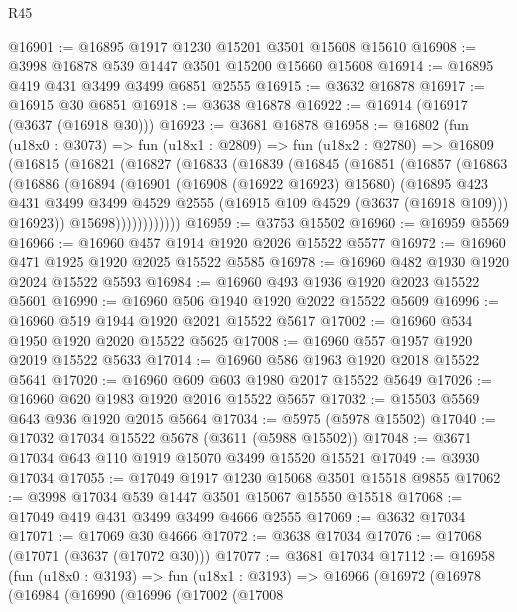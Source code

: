 \begin{lexlean}{R45}
\begin{coremodule}
@16901 := @16895 @1917 @1230 @15201 @3501 @15608 @15610
@16908 := @3998 @16878 @539 @1447 @3501 @15200 @15660 @15608
@16914 := @16895 @419 @431 @3499 @3499 @6851 @2555
@16915 := @3632 @16878
@16917 := @16915 @30 @6851
@16918 := @3638 @16878
@16922 := @16914 (@16917 (@3637 (@16918 @30)))
@16923 := @3681 @16878
@16958 := @16802
    (fun (u18x0 : @3073) =>
    fun (u18x1 : @2809) =>
    fun (u18x2 : @2780) =>
    @16809
      (@16815
        (@16821
          (@16827
            (@16833
              (@16839
                (@16845
                  (@16851
                    (@16857
                      (@16863
                        (@16886
                          (@16894
                            (@16901
                              (@16908 (@16922 @16923) @15680)
                              (@16895
                                @423
                                @431
                                @3499
                                @3499
                                @4529
                                @2555
                                (@16915 @109 @4529 (@3637 (@16918 @109)))
                                @16923))
                            @15698))))))))))))
@16959 := @3753 @15502
@16960 := @16959 @5569
@16966 := @16960 @457 @1914 @1920 @2026 @15522 @5577
@16972 := @16960 @471 @1925 @1920 @2025 @15522 @5585
@16978 := @16960 @482 @1930 @1920 @2024 @15522 @5593
@16984 := @16960 @493 @1936 @1920 @2023 @15522 @5601
@16990 := @16960 @506 @1940 @1920 @2022 @15522 @5609
@16996 := @16960 @519 @1944 @1920 @2021 @15522 @5617
@17002 := @16960 @534 @1950 @1920 @2020 @15522 @5625
@17008 := @16960 @557 @1957 @1920 @2019 @15522 @5633
@17014 := @16960 @586 @1963 @1920 @2018 @15522 @5641
@17020 := @16960 @609 @603 @1980 @2017 @15522 @5649
@17026 := @16960 @620 @1983 @1920 @2016 @15522 @5657
@17032 := @15503 @5569 @643 @936 @1920 @2015 @5664
@17034 := @5975 (@5978 @15502)
@17040 := @17032 @17034 @15522 @5678 (@3611 (@5988 @15502))
@17048 := @3671 @17034 @643 @110 @1919 @15070 @3499 @15520 @15521
@17049 := @3930 @17034
@17055 := @17049 @1917 @1230 @15068 @3501 @15518 @9855
@17062 := @3998 @17034 @539 @1447 @3501 @15067 @15550 @15518
@17068 := @17049 @419 @431 @3499 @3499 @4666 @2555
@17069 := @3632 @17034
@17071 := @17069 @30 @4666
@17072 := @3638 @17034
@17076 := @17068 (@17071 (@3637 (@17072 @30)))
@17077 := @3681 @17034
@17112 := @16958
    (fun (u18x0 : @3193) =>
    fun (u18x1 : @3193) =>
    @16966
      (@16972
        (@16978
          (@16984
            (@16990
              (@16996
                (@17002
                  (@17008

\end{coremodule}
\end{lexlean}
